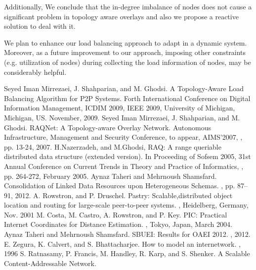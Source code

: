 \documentclass {article}
\begin{document}
Additionally, We conclude that the in-degree imbalance of nodes does not cause a significant problem
in topology aware overlays and also we propose a reactive solution to deal with it.

We plan to enhance our load balancing approach to adapt in a dynamic system. Moreover, as a future improvement to our approach, imposing other constraints (e.g. utilization of nodes) during  collecting the load information of nodes, may be considerably helpful.




\begin{thebibliography}{00}
Seyed Iman Mirrezaei, J. Shahparian, and M. Ghodsi.
\newblock A Topology-Aware Load Balancing Algorithm for P2P Systems.
Forth International
Conference on Digital Information Management, ICDIM 2009, IEEE 2009, University of Michigan, Michigan,
US. November, 2009.
Seyed Iman Mirrezaei, J. Shahparian, and M. Ghodsi.
\newblock RAQNet: A Topology-aware Overlay Network.
 Autonomous Infrastructure, Management and Security Conference, to appear, AIMS'2007, 
, pp. 13-24, 2007.
H.Nazerzadeh, and M.Ghodsi,
\newblock RAQ: A range queriable distributed data structure (extended version).
In Proceeding of Sofsem 2005, 31st Annual Conference on Current Trends in Theory and Practice of Informatics, 
, pp. 264-272, February 2005.
 Aynaz Taheri and Mehrnoush Shamsfard. \newblock Consolidation of Linked Data Resources upon Heterogeneous Schemas. 
, pp. 87--91, 2012.
 A. Rowstron, and P. Druschel.
\newblock Pastry: Scalable,distributed object location and routing for large-scale
peer-to-peer systems.
, Heidelberg, Germany, Nov. 2001
M. Costa, M. Castro, A. Rowstron, and P. Key.
\newblock PIC: Practical Internet Coordinates for Distance Estimation. , Tokyo, Japan, March 2004.
 Aynaz Taheri and Mehrnoush Shamsfard. \newblock SBUEI: Results for OAEI 2012. 
, 2012.
 E. Zegura, K. Calvert, and S. Bhattacharjee.
\newblock How to model an internetwork. , 1996
 S. Ratnasamy, P. Francis, M. Handley, R. Karp, and S. Shenker.
\newblock A Scalable Content-Addressable Network.

\end{thebibliography}
\end{document}
